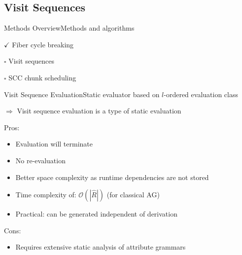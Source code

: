\subsection*{Visit Sequences}{}

\begin{frame}{Methods Overview}{Methods and algorithms}
     \begin{description}
        \item $\checkmark$ Fiber cycle breaking
        \item $\square$  \alert{Visit sequences}
        \item $\square$  SCC chunk scheduling
    \end{description}
\end{frame}


\begin{frame}{Visit Sequence Evaluation}{Static evaluator based on $l$-ordered evaluation class}

$\Rightarrow$ \alert{Visit sequence evaluation} is a type of \alert{static evaluation}

\newlinevspace

Pros:
\begin{itemize}
    \item Evaluation \alert{will terminate}
    \item \alert{No re-evaluation}
    \item Better space complexity as runtime dependencies are not stored
    \item Time complexity of: $\mathcal{O}(| \hat{R} |)$ (for classical AG)
    \item \alert{Practical}: can be generated independent of derivation
\end{itemize}

Cons:
\begin{itemize}
    \item Requires extensive static analysis of attribute grammars
\end{itemize}
\end{frame}




